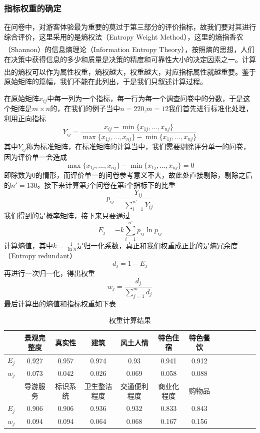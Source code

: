 \documentclass[UTF8]{ctexart}
\newcommand{\upcite}[1]{\textsuperscript{\textsuperscript{\cite{#1}}}}
\begin{document}
        \subsubsection{指标权重的确定}
        在问卷中，对游客体验最为重要的莫过于第三部分的评价指标，故我们要对其进行综合评价，这里采用的是熵权法（Entropy Weight Method），这里的熵指香农（Shannon）的信息熵理论（Information Entropy Theory）\upcite{shannon1948mathematical}，按照熵的思想，人们在决策中获得信息的多少和质量是决策的精度和可靠性大小的决定因素之一。计算出的熵权可以作为属性权重，熵权越大，权重越大，对应指标属性就越重要\upcite{农村老年人社区养老满意度及影响因素研究}。鉴于原始矩阵的篇幅，我们不能在此列出，于是我们只叙述计算过程。

        在原始矩阵$x_{ij}$中每一列为一个指标，每一行为每一个调查问卷中的分数，于是这个矩阵是$m \times n$的，在我们的例子当中$n=220$,$m=12$我们首先进行标准化处理，利用正向指标
        \[Y_{ij}=\frac{x_{ij}-\min\{x_{1j},...,x_{nj}\}}{\max\{x_{1j},...,x_{nj}\}-\min\{x_{1j},...,x_{nj}\}}\]
        其中$Y_{ij}$称为标准矩阵，在标准矩阵的计算当中，我们需要剔除评分单一的问卷，因为评价单一会造成
        \[\max\{x_{1j},...,x_{nj}\}-\min\{x_{1j},...,x_{nj}\}=0\]
        即除数为0的情形，而评价单一的问卷参考意义不大，故此处直接剔除，剔除之后的$n'=130$。接下来计算第$j$个问卷在第$i$个指标下的比重
        \[p_{ij}=\frac{Y_{ij}}{\sum\limits_{i=1}^{n'} Y_{ij}}\]
        我们得到的是概率矩阵，接下来只要通过
        \[E_j=-k\sum\limits_{i=1}^{n'}p_{ij}\ln{p_{ij}}\]
        计算熵值，其中$k=\frac{1}{\ln{n}}$是归一化系数，真正和我们权重成正比的是熵冗余度（Entropy redundant）
        \[d_j=1-E_j\]
        再进行一次归一化，得出权重
        \[w_j=\frac{d_j}{\sum\limits_{j=1}^{m}d_j}\]
        最后计算出的熵值和指标权重如下表
        \begin{table}[H]
            \centering
            \caption{权重计算结果}
            \begin{tabular}{ccccccccccccc}
                \toprule
                &景观完整度&真实性&建筑&风土人情&特色住宿&特色餐饮\\
                \midrule
                $E_j$&0.927&0.957&0.974&0.93&0.941&0.912\\
                $w_j$&0.073&0.042&0.026&0.069&0.058&0.088\\
                \midrule
                &导游服务&标识系统&卫生整洁程度&交通便利程度&商业化程度&购物品\\
                \midrule
                $E_j$&0.906&0.906&0.936&0.932&0.833&0.843\\
                $w_j$&0.094&0.094&0.064&0.068&0.167&0.156\\
                \bottomrule
            \end{tabular}
        \end{table}
\end{document}
